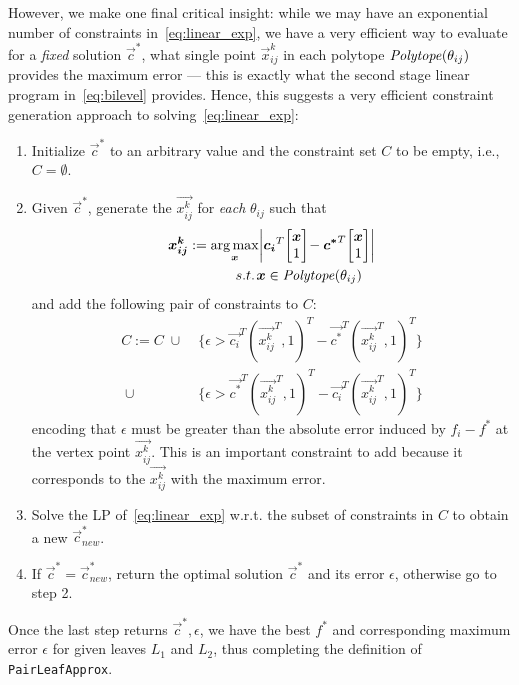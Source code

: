 However, we make one final critical insight: while we may have
an exponential number of constraints in~\eqref{eq:linear_exp}, we have
a very efficient way to evaluate for a \emph{fixed} solution $\vec{c}^*$,
what single point $\vec{x}_{ij}^k$ in each polytope $\mathit{Polytope}(\theta_{ij})$
provides the maximum error --- this is exactly what the second stage
linear program in~\eqref{eq:bilevel} provides.  Hence, this suggests a
very efficient constraint generation approach to
solving~\eqref{eq:linear_exp}: 
\begin{enumerate}
\item Initialize $\vec{c}^*$ to an arbitrary value and the constraint set $C$
to be empty, i.e., $C = \emptyset$.
\item Given $\vec{c}^*$, generate the $\vec{x_{ij}^k}$ for \emph{each} $\theta_{ij}$ such that
\begin{align*}
\vec{x_{ij}^k} := \argmax_{\vec{x}} \! & \left| \vec{c_i}^T \! \mb \vec{x}\\1 \me \! - \vec{c^*}^T \! \mb \vec{x}\\1 \me \right| \\ 
  s.t. \;              \! & \vec{x} \in \PT(\theta_{ij})
\end{align*}
and add the following pair of constraints to $C$:
\begin{align*}
  C := C \; \cup \; & \{ \epsilon > \vec{c_i}^T (\vec{x_{ij}^k}^T,1)^T - \vec{c^*}^T (\vec{x_{ij}^k}^T,1)^T \} \\
         \; \cup \; & \{ \epsilon > \vec{c^*}^T (\vec{x_{ij}^k}^T,1)^T - \vec{c_i}^T (\vec{x_{ij}^k}^T,1)^T \}
\end{align*}
encoding that $\epsilon$ must be greater than the absolute error induced
by $f_i - f^*$ at the vertex point $\vec{x_{ij}^k}$.  This is an important constraint to
add because it corresponds to the $\vec{x_{ij}^k}$ with the maximum error.
\item Solve the LP of~\eqref{eq:linear_exp} w.r.t. the subset of constraints in $C$ to obtain a new $\vec{c}^*_{\mathit{new}}$.
\item If $\vec{c}^* = \vec{c}^*_{\mathit{new}}$, return the optimal solution $\vec{c}^*$ and its error $\epsilon$, otherwise go to step 2.
\end{enumerate}
Once the last step returns $\vec{c}^*,\epsilon$, we have the best $f^*$ and corresponding
maximum error $\epsilon$ for given leaves $L_1$ and $L_2$, thus completing the
definition of \texttt{PairLeafApprox}.

